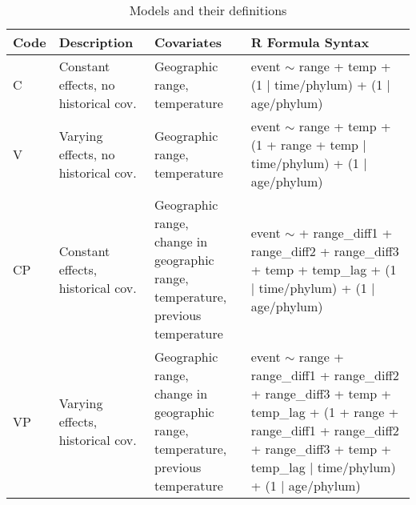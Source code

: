 \documentclass[12pt,letterpaper]{article}
\begin{document}
\begin{table}[ht]
 \caption{Models and their definitions}
 \begin{threeparttable}
  {
   \def\arraystretch{1.5}
   \begin{tabular}{ l p{3cm} l l }
    Code & Description & Covariates & R Formula Syntax\tnote{a}\phantom{\textsuperscript{a}} \\
    \hline
    C & Constant effects, no historical cov. & \parbox[t]{0.25\textwidth}{Geographic range,\\temperature} & \parbox[t]{0.33\textwidth}{event $\sim$ range + temp +\\(1 $|$ time/phylum) +\\(1 $|$ age/phylum)} \\
    V & Varying effects, no historical cov. & \parbox[t]{0.25\textwidth}{Geographic range,\\temperature} & \parbox[t]{0.33\textwidth}{event $\sim$ range + temp +\\(1 + range + temp $|$ time/phylum) + (1 $|$ age/phylum)} \\ 
    CP & Constant effects, historical cov. & \parbox[t]{0.25\textwidth}{Geographic range,\\change in geographic range, temperature,\\previous temperature} & \parbox[t]{0.33\textwidth}{event $\sim$ + range\_diff1 + range\_diff2 + range\_diff3 + \\temp + temp\_lag +\\(1 $|$ time/phylum) +\\(1 $|$ age/phylum)} \\
    VP & Varying effects, historical cov. & \parbox[t]{0.25\textwidth}{Geographic range,\\change in geographic range, temperature,\\previous temperature} & \parbox[t]{0.33\textwidth}{event $\sim$ range + range\_diff1 + range\_diff2 + range\_diff3 + \\temp + temp\_lag +\\(1 + range + range\_diff1 + range\_diff2 + range\_diff3 +\\temp + temp\_lag $|$ time/phylum) +\\(1 $|$ age/phylum)} \\

\end{tabular}}
\end{threeparttable}
\end{table}
\end{document}
